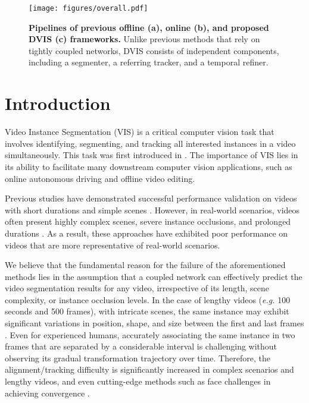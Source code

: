 \documentclass[10pt,twocolumn,letterpaper]{article}
\begin{document}
\begin{figure}[t]
\begin{center}
\texttt{[image: figures/overall.pdf]}\vspace{-2mm}
\end{center}
\caption{\textbf{Pipelines of previous offline (a), online (b), and proposed DVIS (c) frameworks.} Unlike previous methods that rely on tightly coupled networks, DVIS consists of independent components, including a segmenter, a referring tracker, and a temporal refiner.}\vspace{-1mm}
\label{fig:pipelines}
\end{figure}
\section{Introduction}

Video Instance Segmentation (VIS) is a critical computer vision task that involves identifying, segmenting, and tracking all interested instances in a video simultaneously. This task was first introduced in \cite{masktrackrcnn}. The importance of VIS lies in its ability to facilitate many downstream computer vision applications, such as online autonomous driving and offline video editing.

Previous studies \cite{ifc,mask2former,seqformer,vita} have demonstrated successful performance validation on videos with short durations and simple  scenes \cite{masktrackrcnn}. However, in real-world scenarios, videos often present highly complex scenes, severe instance occlusions, and prolonged durations \cite{ovis}. As a result, these approaches \cite{ifc,mask2former,seqformer,vita} have exhibited poor performance on videos \cite{ovis} that are more representative of real-world scenarios.

We believe that the fundamental reason for the failure of the aforementioned methods \cite{ifc, mask2former, seqformer, vita} lies in the assumption that a coupled network can effectively predict the video segmentation results for any video, irrespective of its length, scene complexity, or instance occlusion levels. In the case of lengthy videos (\textit{e.g.} 100 seconds and 500 frames), with intricate scenes, the same instance may exhibit significant variations in position, shape, and size between the first and last frames \cite{ovis}. Even for experienced humans, accurately associating the same instance in two frames that are separated by a considerable interval is challenging without observing its gradual transformation trajectory over time. Therefore, the alignment/tracking difficulty is significantly increased in complex scenarios and lengthy videos, and even cutting-edge methods such as \cite{mask2formervis} face challenges in achieving convergence \cite{minvis}.
\end{document}
